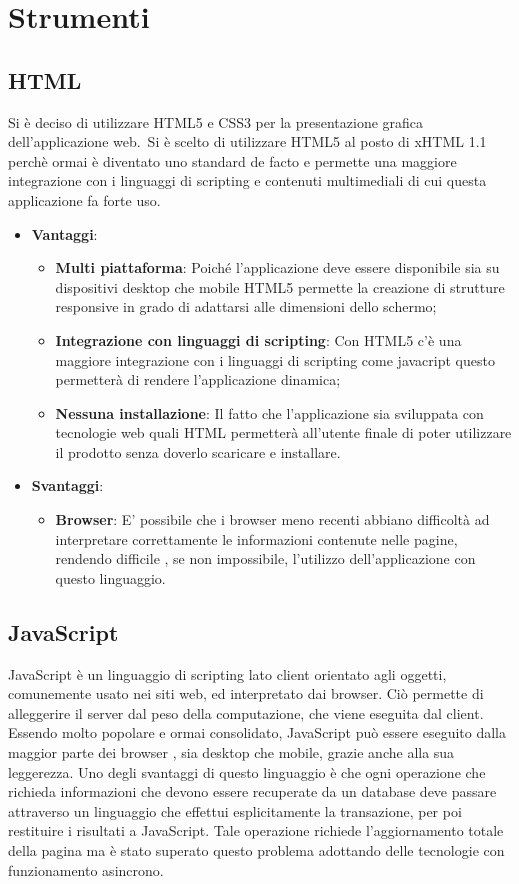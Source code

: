 \section{Strumenti}
\subsection{HTML}
Si è deciso di utilizzare HTML5 e CSS3 per la presentazione grafica dell'applicazione web.\
Si è scelto di utilizzare HTML5 al posto di xHTML 1.1 perchè ormai è diventato uno standard de facto e permette una maggiore integrazione con i linguaggi di scripting e contenuti multimediali
di cui questa applicazione fa forte uso.

\begin{itemize}
\item \textbf{Vantaggi}: 
\begin{itemize}
\item \textbf{Multi piattaforma}: Poiché l'applicazione deve essere disponibile sia su dispositivi desktop che mobile HTML5 permette la creazione di strutture responsive in grado di adattarsi alle dimensioni dello schermo;
\item \textbf{Integrazione con linguaggi di scripting}: Con HTML5 c'è una maggiore integrazione con i linguaggi di scripting come javacript questo permetterà di rendere l'applicazione dinamica;
\item \textbf{Nessuna installazione}: Il fatto che l'applicazione sia sviluppata con tecnologie web quali HTML permetterà all'utente finale di poter utilizzare il prodotto senza doverlo scaricare e installare.
\end{itemize}
\item \textbf{Svantaggi}:
\begin{itemize}


\item \textbf{Browser}: E' possibile che i browser meno recenti abbiano difficoltà ad interpretare correttamente le informazioni contenute nelle pagine, rendendo difficile , se non impossibile, l'utilizzo dell'applicazione con questo linguaggio.
\end{itemize}
\end{itemize}
\subsection{JavaScript}
JavaScript è un linguaggio di scripting lato client orientato agli oggetti, comunemente usato nei siti web, ed interpretato dai browser. Ciò permette di alleggerire il server dal peso della computazione, che viene eseguita dal client. Essendo molto popolare e ormai consolidato, JavaScript può essere eseguito dalla maggior parte dei browser , sia desktop che mobile, grazie anche alla sua leggerezza. Uno degli svantaggi di questo linguaggio è che ogni operazione che richieda informazioni che devono essere recuperate da un database deve passare attraverso un linguaggio che effettui esplicitamente la transazione, per poi restituire i
risultati a JavaScript. Tale operazione richiede l’aggiornamento totale della pagina ma è stato superato questo problema adottando delle tecnologie con funzionamento asincrono.
